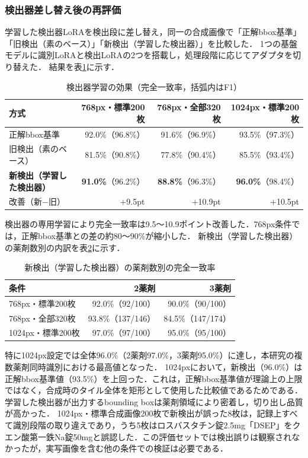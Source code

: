 \documentclass[dvipdfmx]{jsarticle}
\begin{document}
\subsubsection{検出器差し替え後の再評価}

学習した検出器LoRAを検出段に差し替え，同一の合成画像で「正解bbox基準」「旧検出（素のベース）」「新検出（学習した検出器）」を比較した．
1つの基盤モデルに識別LoRAと検出LoRAの2つを搭載し，処理段階に応じてアダプタを切り替えた．
結果を表\ref{tab:a3}に示す．

\begin{table}[htbp]
\centering
\caption{検出器学習の効果（完全一致率，括弧内はF1）}
\label{tab:a3}
\small
\setlength{\tabcolsep}{4pt}
\begin{tabular}{lrrr}
\hline
方式 & 768px・標準200枚 & 768px・全部320枚 & 1024px・標準200枚 \\
\hline
正解bbox基準 & 92.0\%（96.8\%） & 91.6\%（96.9\%） & 93.5\%（97.3\%） \\
旧検出（素のベース） & 81.5\%（90.8\%） & 77.8\%（90.4\%） & 85.5\%（93.4\%） \\
\textbf{新検出（学習した検出器）} & \textbf{91.0\%}（96.2\%） & \textbf{88.8\%}（96.3\%） & \textbf{96.0\%}（98.4\%） \\
改善（新$-$旧） & +9.5pt & +10.9pt & +10.5pt \\
\hline
\end{tabular}
\end{table}

検出器の専用学習により完全一致率は9.5〜10.9ポイント改善した．768px条件では，正解bbox基準との差の約80〜90\%が縮小した．
新検出（学習した検出器）の薬剤数別の内訳を表\ref{tab:a3_group}に示す．

\begin{table}[htbp]
\centering
\caption{新検出（学習した検出器）の薬剤数別の完全一致率}
\label{tab:a3_group}
\small
\begin{tabular}{lrr}
\hline
条件 & 2薬剤 & 3薬剤 \\
\hline
768px・標準200枚 & 92.0\%（92/100） & 90.0\%（90/100） \\
768px・全部320枚 & 93.8\%（137/146） & 84.5\%（147/174） \\
1024px・標準200枚 & 97.0\%（97/100） & 95.0\%（95/100） \\
\hline
\end{tabular}
\end{table}

特に1024px設定では全体96.0\%（2薬剤97.0\%，3薬剤95.0\%）に達し，本研究の複数薬剤同時識別における最高値となった．
1024pxにおいて，新検出（96.0\%）は正解bbox基準値（93.5\%）を上回った．これは，正解bbox基準値が理論上の上限ではなく，合成時のタイル全体を矩形として使用した比較値であるためである．学習した検出器が出力するbounding boxは薬剤領域により密着し，切り出し品質が高かった．
1024px・標準合成画像200枚で新検出が誤った8枚は，記録上すべて識別段階の取り違えであり，うち5枚はロスバスタチン錠2.5mg「DSEP」をクエン酸第一鉄Na錠50mgと誤認した．この評価セットでは検出誤りは観察されなかったが，実写画像を含む他の条件での検証は必要である．
\end{document}
